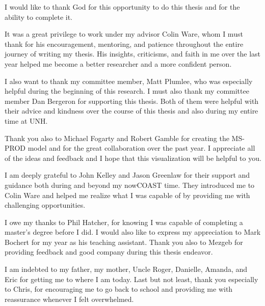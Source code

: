\begin{acknowledgments}
I would like to thank God for this opportunity to do this thesis and for the ability to complete it.

It was a great privilege to work under my advisor Colin Ware, whom I must thank for his encouragement, mentoring, and patience throughout the entire journey of writing my thesis.  His insights, criticisms, and faith in me over the last year helped me become a better researcher and a more confident person.

I also want to thank my committee member, Matt Plumlee, who was especially helpful during the beginning of this research.  I must also thank my committee member Dan Bergeron for supporting this thesis.  Both of them were helpful with their advice and kindness over the course of this thesis and also during my entire time at UNH.

Thank you also to Michael Fogarty and Robert Gamble for creating the MS-PROD model and for the great collaboration over the past year.  I appreciate all of the ideas and feedback and I hope that this visualization will be helpful to you.

I am deeply grateful to John Kelley and Jason Greenlaw for their support and guidance both during and beyond my nowCOAST time.  They introduced me to Colin Ware and helped me realize what I was capable of by providing me with challenging opportunities.

I owe my thanks to Phil Hatcher, for knowing I was capable of completing a master's degree before I did.  I would also like to express my appreciation to Mark Bochert for my year as his teaching assistant.  Thank you also to Mezgeb for providing feedback and good company during this thesis endeavor.

I am indebted to my father, my mother, Uncle Roger, Danielle, Amanda, and Eric for getting me to where I am today.  Last but not least, thank you especially to Chris, for encouraging me to go back to school and providing me with reassurance whenever I felt overwhelmed.  

\end{acknowledgments}